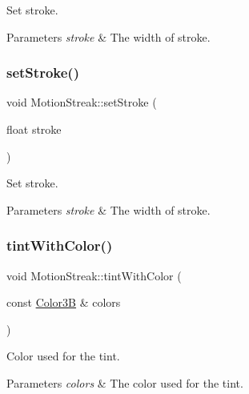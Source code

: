 Set stroke.


\begin{DoxyParams}{Parameters}
{\em stroke} & The width of stroke. \\
\hline
\end{DoxyParams}
\mbox{\label{classMotionStreak_abba05cb77e5d622147577add730d15b9}} 
\subsubsection{\texorpdfstring{set\+Stroke()}{setStroke()}\hspace{0.1cm}{\footnotesize\ttfamily [2/2]}}
{\footnotesize\ttfamily void Motion\+Streak\+::set\+Stroke (\begin{DoxyParamCaption}\item[{float}]{stroke }\end{DoxyParamCaption})\hspace{0.3cm}{\ttfamily [inline]}}

Set stroke.


\begin{DoxyParams}{Parameters}
{\em stroke} & The width of stroke. \\
\hline
\end{DoxyParams}
\mbox{\label{classMotionStreak_afc5b74bffba734239d696a2f333c2734}} 
\subsubsection{\texorpdfstring{tint\+With\+Color()}{tintWithColor()}\hspace{0.1cm}{\footnotesize\ttfamily [1/2]}}
{\footnotesize\ttfamily void Motion\+Streak\+::tint\+With\+Color (\begin{DoxyParamCaption}\item[{const \hyperlink{structColor3B}{Color3B} \&}]{colors }\end{DoxyParamCaption})}

Color used for the tint.


\begin{DoxyParams}{Parameters}
{\em colors} & The color used for the tint. \\
\hline
\end{DoxyParams}
\mbox{\label{classMotionStreak_afc5b74bffba734239d696a2f333c2734}} 
